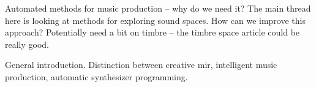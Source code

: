 



Automated methods for music production -- why do we need it? The main thread here is looking at methods for exploring sound spaces. How can we improve this approach? Potentially need a bit on timbre -- the timbre space article could be really good.

General introduction. Distinction between creative mir, intelligent music production, automatic synthesizer programming.

